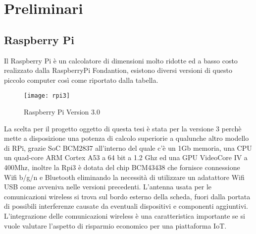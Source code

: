 
\chapter{Preliminari}

\ifpdf
    \graphicspath{{Chapter2/Figs/Raster/}{Chapter2/Figs/PDF/}{Chapter2/Figs/}}
\else
    \graphicspath{{Chapter2/Figs/Vector/}{Chapter2/Figs/}}
\fi


\section{Raspberry Pi}
Il Raspberry Pi è un calcolatore di  dimensioni molto ridotte ed a basso costo realizzato dalla RaspberryPi Fondantion, esistono diversi versioni di questo piccolo computer  così come riportato dalla tabella.

\begin{figure}[htbp!] 
	\centering    
	\texttt{[image: rpi3]}
	\caption[RaspberryPi V3.0]{Raspberry Pi Version 3.0}
	\label{fig:rpi3}
\end{figure}

La scelta per il progetto oggetto di questa tesi è stata per la versione 3  perchè mette a disposizione una potenza di calcolo superiorie a qualunche altro modello di RPi, grazie SoC BCM2837 all'interno del quale c'è  un 1Gb memoria, una CPU un quad-core ARM Cortex A53 a 64 bit a 1.2 Ghz ed una GPU VideoCore IV a 400Mhz, inoltre la Rpi3 è dotata del chip BCM43438 che fornisce connessione Wifi b/g/n e Bluetooth eliminando la necessità di utilizzare  un adatattore Wifi USB come avveniva nelle versioni precedenti.
L'antenna usata per le comunicazioni wireless si  trova sul bordo esterno della scheda, fuori dalla portata di possibili interferenze causate  da eventuali dispositivi e componenti aggiuntivi. L'integrazione delle comunicazioni wireless è una caratteristica importante se si vuole valutare l'aspetto di risparmio economico per una piattaforma IoT.

